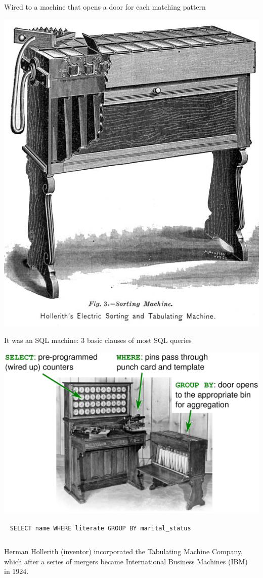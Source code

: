 \documentclass[aspectratio=169]{beamer}
\begin{document}
\begin{frame}{Wired to a machine that opens a door for each matching pattern}
\vspace{0.25 cm}
\begin{center}
\includegraphics[width=0.45\linewidth]{1890_Hollerith_Sorting_Machine_OM.jpg}
\end{center}
\end{frame}

\begin{frame}{It was an SQL machine: 3 basic clauses of most SQL queries}
\vspace{0.25 cm}
\begin{center}
\includegraphics[width=0.75\linewidth]{hh-tabulator.pdf}
\end{center}

\mbox{ } \hfill \texttt{SELECT name WHERE literate GROUP BY marital_status} \hfill \mbox{ }
\end{frame}

\begin{frame}{}
\large
\vspace{1.25 cm}
\begin{columns}
Herman Hollerith (inventor) incorporated the Tabulating Machine Company, which after a series of mergers became International Business Machines (IBM) in 1924.

\vspace{1 cm}

\vspace{0.75 cm}
\begin{center}
\end{center}
\end{columns}
\end{frame}
\end{document}
